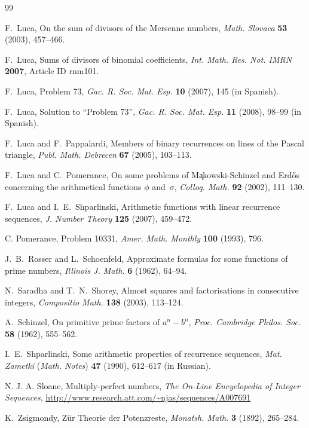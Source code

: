 \documentclass[twoside,amsthm]{elsart}
\begin{document}
\begin{thebibliography}{99}

 F.~Luca, On the sum of divisors of the Mersenne numbers,
\textit{Math. Slovaca} \textbf{53} (2003),  457--466.

 F.~Luca, Sums of divisors of
binomial coefficients, \textit{Int. Math. Res. Not. IMRN}
\textbf{2007}, Article ID rnm101.

 F.~Luca, Problem 73,
\textit{Gac. R. Soc. Mat. Esp.} \textbf{10} (2007), 145 (in
Spanish).

 F.~Luca, Solution to ``Problem 73'',
\textit{Gac. R. Soc. Mat. Esp.} \textbf{11} (2008), 98--99 (in
Spanish).

 F.~Luca and F.~Pappalardi, Members of binary recurrences
on lines of the Pascal triangle, \textit{Publ. Math. Debrecen}
\textbf{67} (2005), 103--113.

 F.~Luca and C.~Pomerance,
On some problems of M\c{a}kowski-Schinzel and Erd\H{o}s concerning the
arithmetical functions $\phi$ and~$\sigma$,
\textit{Colloq. Math.} \textbf{92} (2002),
111--130.

 F.~Luca and I.~E.~Shparlinski, Arithmetic functions with
linear recurrence sequences, \textit{J. Number Theory} \textbf{125}
(2007), 459--472.

 C. Pomerance, Problem 10331,
\textit{Amer. Math. Monthly} \textbf{100} (1993), 796.

 J.~B.~Rosser and L.~Schoenfeld, Approximate formulas
for some functions of prime numbers, \textit{Illinois J. Math.}
\textbf{6} (1962), 64--94.

 N.~Saradha and T.~N.~Shorey, Almost squares and factorisations in
consecutive integers, \textit{Compositio Math.}  \textbf{138}
(2003), 113--124.

 A.~Schinzel, On primitive prime factors of $a^n-b^n$,
\textit{Proc. Cambridge Philos. Soc.} \textbf{58} (1962), 555--562.

 I.~E.~Shparlinski,
Some arithmetic properties of recurrence sequences, \textit{Mat.
Zametki} (\textit{Math. Notes}) \textbf{47} (1990), 612--617 (in Russian).

N. J. A. Sloane, Multiply-perfect numbers, \textit{The On-Line
Encyclopedia of Integer Sequences},
\url{http://www.research.att.com/~njas/sequences/A007691}

 K.~Zsigmondy, Z\"ur Theorie der Potenzreste, \textit{Monatsh. Math.}
\textbf{3} (1892), 265--284.

\end{thebibliography}
\end{document}
